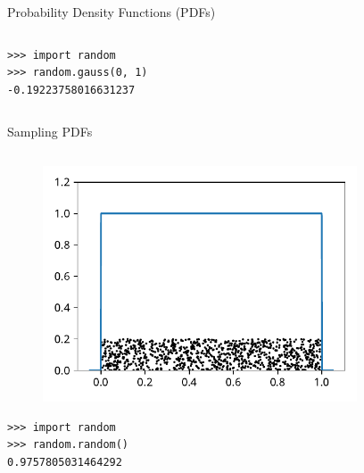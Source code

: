 \documentclass[12pt, aspectratio=149]{beamer}
\theoremstyle{plain}
\begin{document}
\begin{frame}[fragile]{Probability Density Functions (PDFs)}
\begin{columns}
\begin{column}{0.5\textwidth}
\begin{center}
\begin{figure}
		 \end{figure}
		  \begin{verbatim}
>>> import random
>>> random.gauss(0, 1)
-0.19223758016631237
		  \end{verbatim}
		 \end{center}
	\end{column}
	\end{columns}
	\end{frame}


\begin{frame}[fragile]{Sampling PDFs}
	\begin{columns}
	\begin{column}{0.5\textwidth}
		\begin{center}
		 \begin{figure}
			 \centering
			 \includegraphics[width=0.99\linewidth]{figures/uniform_samples}
		 \end{figure}
		 \begin{verbatim}
>>> import random
>>> random.random()
0.9757805031464292
		 \end{verbatim}
		 \end{center}
	\end{column}
	\begin{column}{0.5\textwidth}  %
		\begin{center}
		 \begin{figure}
			 \centering

\end{figure}
\end{center}
\end{column}
\end{columns}
\end{frame}
\end{document}
